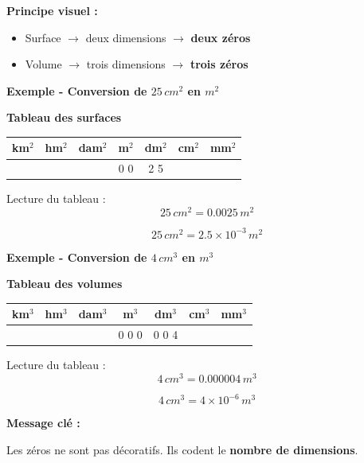 \documentclass[11pt,a4paper]{article}
\newcommand{\theorybox}[2]{
\begin{tcolorbox}[title=\textbf{#1}]
#2
\end{tcolorbox}
}
\begin{document}
\theorybox{E - Conversion des surfaces et volumes (tableau dimensionnel)}{

\textbf{Principe visuel :}

\begin{itemize}
\item Surface $\rightarrow$ deux dimensions $\rightarrow$ \textbf{deux zéros}
\item Volume $\rightarrow$ trois dimensions $\rightarrow$ \textbf{trois zéros}
\end{itemize}

\vspace{0.2cm}

\textbf{Exemple - Conversion de $25\,\si{cm^2}$ en $\si{m^2}$}

\begin{center}
\textbf{Tableau des surfaces}
\begin{tabular}{c|c|c|c|c|c|c}
km$^2$ & hm$^2$ & dam$^2$ & m$^2$ & dm$^2$ & cm$^2$ & mm$^2$ \\
\hline
       &        &         & 0 0 & 2 5 &       &        \\
\end{tabular}
\end{center}

Lecture du tableau :
\[
25\,\si{cm^2} = 0.0025\,\si{m^2}
\]

\[
25\,\si{cm^2} = 2.5 \times 10^{-3}\,\si{m^2}
\]

\vspace{0.4cm}

\textbf{Exemple - Conversion de $4\,\si{cm^3}$ en $\si{m^3}$}

\begin{center}
\textbf{Tableau des volumes}
\begin{tabular}{c|c|c|c|c|c|c}
km$^3$ & hm$^3$ & dam$^3$ & m$^3$ & dm$^3$ & cm$^3$ & mm$^3$ \\
\hline
       &        &         & 0 0 0 & 0 0 4 &        &        \\
\end{tabular}
\end{center}

Lecture du tableau :
\[
4\,\si{cm^3} = 0.000004\,\si{m^3}
\]

\[
4\,\si{cm^3} = 4 \times 10^{-6}\,\si{m^3}
\]

\vspace{0.2cm}

\textbf{Message clé :}

Les zéros ne sont pas décoratifs.  
Ils codent le \textbf{nombre de dimensions}.

}
\end{document}
